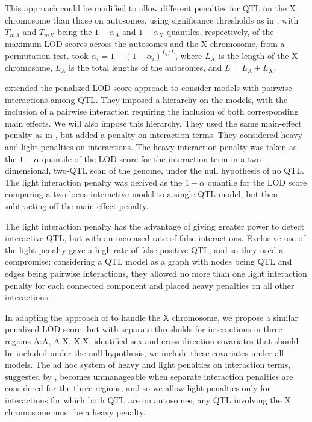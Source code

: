 \documentclass[12pt,letterpaper]{article}
\begin{document}
This approach could be modified to allow different penalties for QTL
on the X chromosome than those on autosomes, using significance
thresholds as in \citet{Broman2006}, with $T_{mA}$ and $T_{mX}$ being
the $1-\alpha_A$ and $1-\alpha_X$ quantiles, respectively, of the
maximum LOD scores across the autosomes and the X chromosome, from
a permutation test. \citet{Broman2006} took $\alpha_i = 1
- (1-\alpha_i)^{L_i/L}$, where $L_X$ is the length of the X
chromosome, $L_A$ is the total lengths of the autosomes, and $L = L_A
+ L_X$.


\citet{Manichaikul2009} extended the penalized LOD score approach to
consider models with pairwise interactions among QTL. They imposed a
hierarchy on the models, with the inclusion of a pairwise interaction
requiring the inclusion of both corresponding main effects. We will
also impose this hierarchy. They used the same main-effect penalty as
in \citet{Broman2002}, but added a penalty on interaction terms. They
considered heavy and light penalties on interactions. The heavy
interaction penalty was taken as the $1-\alpha$ quantile of the LOD
score for the interaction term in a two-dimensional, two-QTL scan of
the genome, under the null hypothesis of no QTL. The light interaction
penalty was derived as the $1-\alpha$ quantile for the LOD score
comparing a two-locus interactive model to a single-QTL model, but
then subtracting off the main effect penalty.

The light interaction penalty has the advantage of giving greater
power to detect interactive QTL, but with an increased rate of false
interactions. Exclusive use of the light penalty gave a high rate of
false positive QTL, and so they used a compromise: considering a QTL
model as a graph with nodes being QTL and edges being pairwise
interactions, they allowed no more than one light interaction penalty
for each connected component and placed heavy penalties on all other
interactions.

In adapting the approach of \citet{Manichaikul2009} to handle the X
chromosome, we propose a similar penalized LOD score, but with
separate thresholds for interactions in three regions A:A, A:X,
X:X. \citet{Broman2006} identified sex and cross-direction
covariates that should be included under the null hypothesis; we
include these covariates under all models. The ad hoc system of heavy and
light penalties on interaction terms, suggested by
\citet{Manichaikul2009}, becomes unmanageable when separate
interaction penalties are considered for the three regions, and so we
allow light penalties only for interactions for which both QTL are on
autosomes; any QTL involving the X chromosome must be a heavy penalty.
\end{document}
